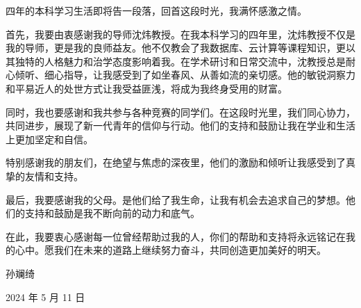 \begin{acknowledgement}	
    四年的本科学习生活即将告一段落，回首这段时光，我满怀感激之情。

    首先，我要由衷感谢我的导师沈炜教授。在我本科学习的四年里，沈炜教授不仅是我的导师，更是我的良师益友。他不仅教会了我数据库、云计算等课程知识，更以其独特的人格魅力和治学态度影响着我。在学术研讨和日常交流中，沈教授总是耐心倾听、细心指导，让我感受到了如坐春风、从善如流的亲切感。他的敏锐洞察力和平易近人的处世方式让我受益匪浅，将成为我终身受用的财富。
    
    同时，我也要感谢和我共参与各种竞赛的同学们。在这段时光里，我们同心协力，共同进步，展现了新一代青年的信仰与行动。他们的支持和鼓励让我在学业和生活上更加坚定和自信。
    
    特别感谢我的朋友们，在绝望与焦虑的深夜里，他们的激励和倾听让我感受到了真挚的友情和支持。
    
    最后，我要感谢我的父母。是他们给了我生命，让我有机会去追求自己的梦想。他们的支持和鼓励是我不断向前的动力和底气。
    
    在此，我要衷心感谢每一位曾经帮助过我的人，你们的帮助和支持将永远铭记在我的心中。愿我们在未来的道路上继续努力奋斗，共同创造更加美好的明天。
    \begin{flushright}
    孙斓绮
    
    2024 年 5 月 11 日
    \end{flushright}
\end{acknowledgement}